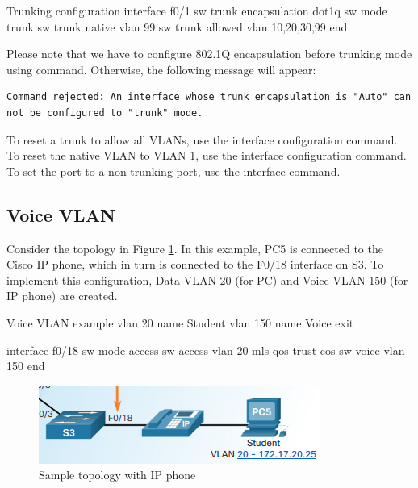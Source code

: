 \begin{sexylisting}{Trunking configuration}
interface f0/1
  sw trunk encapsulation dot1q
  sw mode trunk
  sw trunk native vlan 99
  sw trunk allowed vlan 10,20,30,99
end
\end{sexylisting}

Please note that we have to configure 802.1Q encapsulation before trunking mode using  command. Otherwise, the following message will appear:

\begin{verbatim}
Command rejected: An interface whose trunk encapsulation is "Auto" can not be configured to "trunk" mode. 
\end{verbatim}

To reset a trunk to allow all VLANs, use the  interface configuration command. To reset the native VLAN to VLAN 1, use the  interface configuration command. To set the port to a non-trunking port, use the  interface command.

\subsection{Voice VLAN}

Consider the topology in Figure \ref{VoiceVLAN}. In this example, PC5 is connected to the Cisco IP phone, which in turn is connected to the F0/18 interface on S3. To implement this configuration, Data VLAN 20 (for PC) and Voice VLAN 150 (for IP phone) are created. 

\begin{sexylisting}{Voice VLAN example}
vlan 20
  name Student
  vlan 150
  name Voice
exit

interface f0/18
  sw mode access
  sw access vlan 20
  mls qos trust cos
  sw voice vlan 150
end
\end{sexylisting}

\begin{figure}[hbtp]
\caption{Sample topology with IP phone}\label{VoiceVLAN}
\centering
\includegraphics[scale=0.6]{pictures/VoiceVLAN.PNG}
\end{figure}

